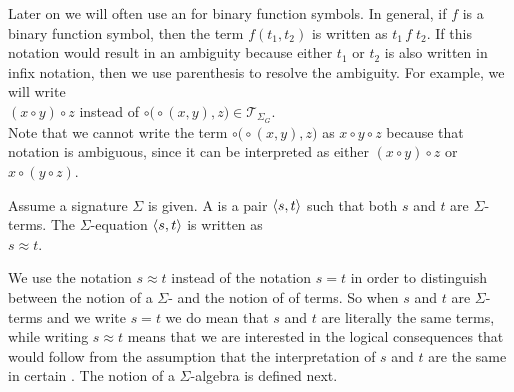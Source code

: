 \remark
Later on we will often use an  for binary function symbols.  In general, if $f$ is a
binary function symbol, then the term $f(t_1,t_2)$ is written as $t_1 \,f\; t_2$.  If this notation would
result in an ambiguity because either $t_1$ or $t_2$ is also written in infix notation, then we use parenthesis
to resolve the ambiguity.  For example, we will write
\\[0.2cm]
\hspace*{1.3cm}
$(x \circ y) \circ z$ \quad instead of \quad $\circ\bigl(\circ(x,y),z\bigr) \in \mathcal{T}_{\Sigma_G}$.  
\\[0.2cm]
Note that we cannot write the term $\circ\bigl(\circ(x,y),z\bigr)$ as $x \circ y \circ z$ because that notation
is ambiguous, since it can be interpreted as either $(x \circ y) \circ z$ or $x \circ (y \circ z)$.
\eoxs

\begin{Definition}
  Assume a signature $\Sigma$ is given.  A  is a pair $\pair(s,t)$ such
  that both $s$ and $t$ are $\Sigma$-terms.  The $\Sigma$-equation $\pair(s,t)$ is written as
  \\[0.2cm]
  \hspace*{1.3cm}
  $s \approx t$.  \eoxs
\end{Definition}

\remark
We use the notation $s \approx t$ instead of the notation $s=t$ in order to distinguish between the notion of a
$\Sigma$- and the notion of  of terms.  So when $s$ and $t$ are $\Sigma$-terms and we
write $s = t$ we do mean that $s$ and $t$ are literally the same terms, while writing $s \approx t$
means that we are interested in the logical consequences that would follow from the assumption that the
interpretation of $s$ and $t$ are the same in certain .  The notion of a $\Sigma$-algebra
is defined next.  \eoxs

